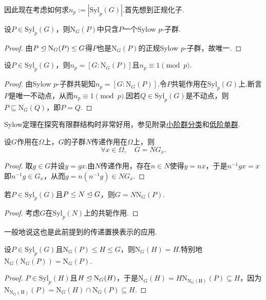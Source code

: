 因此现在考虑如何求$n_p:=|\mathrm{Syl}_p(G)|$.首先想到正规化子.
\begin{lemma*}
	设$P\in\mathrm{Syl}_p(G)$，则$\mathrm{N}_G(P)$中只含$P$一个Sylow $p$-子群.
\end{lemma*}
\begin{proof}
	由$P\trianglelefteq\mathrm{N}_G(P)\le G$得$P$也是$\mathrm{N}_G(P)$的正规Sylow $p$-子群，故唯一.
\end{proof}
\begin{thm}[(Sylow第三定理)]
	设$P\in\mathrm{Syl}_p(G)$，则$n_p=[G:\mathrm{N}_G(P)]$且$n_p\equiv 1\pmod{p}$.
\end{thm}
\begin{proof}
	由Sylow $p$-子群共轭知$n_p=[G:\mathrm{N}_G(P)]$.令$P$共轭作用在$\mathrm{Syl}_p(G)$上.断言$P$是唯一不动点，从而$n_p\equiv 1\pmod{p}$.因若$Q\in\mathrm{Syl}_p(G)$是不动点，则$P\subseteq\mathrm{N}_G(Q)$，即$P=Q$.
\end{proof}

Sylow定理在探究有限群结构时非常好用，参见附录\hyperref[subsec:ClassificationSmallOrder]{小阶群分类}和\hyperref[subsec:SimpleGrpLowOrder]{低阶单群}.
\begin{prop}[(Frattini)]
	设$G$作用在$\Omega$上，$G$的子群$N$传递作用在$\Omega$上，则
	\[
		\forall x\in\Omega,\quad G=NG_x.
	\]
\end{prop}
\begin{proof}
	取$g\in G$并设$y=gx$.由$N$传递作用，存在$n\in N$使得$y=nx$，于是$n^{-1}gx=x$即$n^{-1}g\in G_x$，从而$g=n(n^{-1}g)\in NG_x$.
\end{proof}
\begin{cor*}[(Frattini)]
	若$P\in\mathrm{Syl}_p(G)$且$P\le N\trianglelefteq G$，则$G=N\mathrm{N}_G(P)$.
\end{cor*}
\begin{proof}
	考虑$G$在$\mathrm{Syl}_p(N)$上的共轭作用.
\end{proof}
\begin{remark}
	一般地说这也是此前提到的传递置换表示的应用.
\end{remark}
\begin{cor*}
	设$P\in\mathrm{Syl}_p(G)$且$\mathrm{N}_G(P)\le H\le G$，则$\mathrm{N}_G(H)=H$.特别地$\mathrm{N}_G(\mathrm{N}_G(P))=\mathrm{N}_G(P)$.
\end{cor*}
\begin{proof}
	$P\in\mathrm{Syl}_p(H)$且$H\trianglelefteq\mathrm{N}_G(H)$，于是$\mathrm{N}_G(H)=H\mathrm{N}_{\mathrm{N_G(H)}}(P)\subseteq H$，因为$\mathrm{N}_{\mathrm{N_G(H)}}(P)=\mathrm{N}_G(H)\cap\mathrm{N}_G(P)\subseteq H$.
\end{proof}

